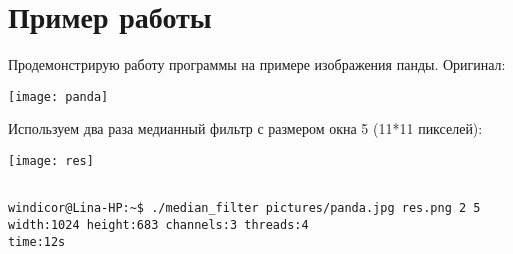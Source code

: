\section{Пример работы}

Продемонстрирую работу программы на примере изображения панды. Оригинал:

\texttt{[image: panda]}

Используем два раза медианный фильтр с размером окна 5 (11*11 пикселей):

\texttt{[image: res]}

\begin{verbatim}

windicor@Lina-HP:~$ ./median_filter pictures/panda.jpg res.png 2 5
width:1024 height:683 channels:3 threads:4
time:12s

\end{verbatim}

\pagebreak


